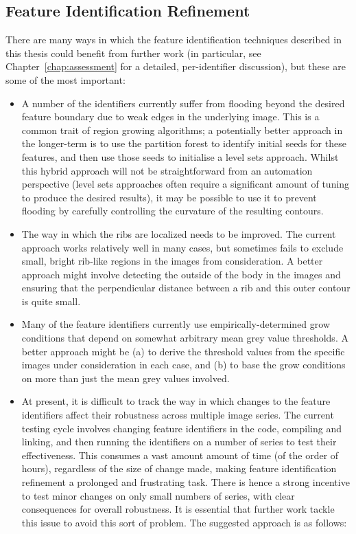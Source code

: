 \subsection{Feature Identification Refinement}

There are many ways in which the feature identification techniques described in this thesis could benefit from further work (in particular, see Chapter~\ref{chap:assessment} for a detailed, per-identifier discussion), but these are some of the most important:
%
\begin{itemize}

\item A number of the identifiers currently suffer from flooding beyond the desired feature boundary due to weak edges in the underlying image. This is a common trait of region growing algorithms; a potentially better approach in the longer-term is to use the partition forest to identify initial seeds for these features, and then use those seeds to initialise a level sets approach. Whilst this hybrid approach will not be straightforward from an automation perspective (level sets approaches often require a significant amount of tuning to produce the desired results), it may be possible to use it to prevent flooding by carefully controlling the curvature of the resulting contours.

\item The way in which the ribs are localized needs to be improved. The current approach works relatively well in many cases, but sometimes fails to exclude small, bright rib-like regions in the images from consideration. A better approach might involve detecting the outside of the body in the images and ensuring that the perpendicular distance between a rib and this outer contour is quite small.

\item Many of the feature identifiers currently use empirically-determined grow conditions that depend on somewhat arbitrary mean grey value thresholds. A better approach might be (a) to derive the threshold values from the specific images under consideration in each case, and (b) to base the grow conditions on more than just the mean grey values involved.

\item At present, it is difficult to track the way in which changes to the feature identifiers affect their robustness across multiple image series. The current testing cycle involves changing feature identifiers in the code, compiling and linking, and then running the identifiers on a number of series to test their effectiveness. This consumes a vast amount amount of time (of the order of hours), regardless of the size of change made, making feature identification refinement a prolonged and frustrating task. There is hence a strong incentive to test minor changes on only small numbers of series, with clear consequences for overall robustness. It is essential that further work tackle this issue to avoid this sort of problem. The suggested approach is as follows:
%
\begin{enumerate}


\end{enumerate}
\end{itemize}
